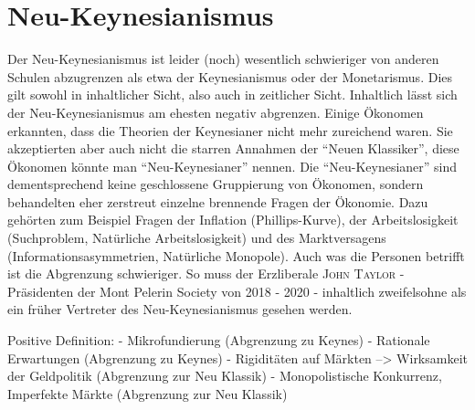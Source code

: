 %
%
%

\chapter{Neu-Keynesianismus} \label{cha: Neu Keynes}

Der Neu-Keynesianismus ist leider (noch) wesentlich schwieriger von anderen Schulen abzugrenzen als etwa der Keynesianismus oder der Monetarismus. Dies gilt sowohl in inhaltlicher Sicht, also auch in zeitlicher Sicht. Inhaltlich lässt sich der Neu-Keynesianismus am ehesten negativ abgrenzen. Einige Ökonomen erkannten, dass die Theorien der Keynesianer nicht mehr zureichend waren. Sie akzeptierten aber auch nicht die starren Annahmen der "`Neuen Klassiker"', diese Ökonomen könnte man "`Neu-Keynesianer"' nennen. Die "`Neu-Keynesianer"' sind dementsprechend keine geschlossene Gruppierung von Ökonomen, sondern behandelten eher zerstreut einzelne brennende Fragen der Ökonomie. Dazu gehörten zum Beispiel Fragen der Inflation (Phillips-Kurve), der Arbeitslosigkeit (Suchproblem, Natürliche Arbeitslosigkeit) und des Marktversagens (Informationsasymmetrien, Natürliche Monopole). 
Auch was die Personen betrifft ist die Abgrenzung schwieriger. So muss der Erzliberale \textsc{John Taylor} - Präsidenten der Mont Pelerin Society von 2018 - 2020 - inhaltlich zweifelsohne als ein früher Vertreter des Neu-Keynesianismus gesehen werden. 

Positive Definition:
- Mikrofundierung (Abgrenzung zu Keynes)
- Rationale Erwartungen (Abgrenzung zu Keynes)
- Rigiditäten auf Märkten --> Wirksamkeit der Geldpolitik (Abgrenzung zur Neu Klassik)
- Monopolistische Konkurrenz, Imperfekte Märkte (Abgrenzung zur Neu Klassik)


